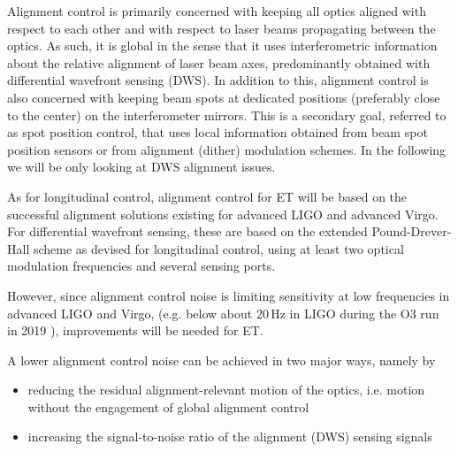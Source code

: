 Alignment control is primarily concerned with keeping all optics aligned with respect to each other
and with respect to laser beams propagating between the optics.
As such, it is global in the sense that it uses interferometric information about the relative alignment
of laser beam axes, predominantly obtained with differential wavefront sensing (DWS). 
In addition to this, alignment control is also concerned with keeping beam spots at dedicated positions (preferably close to the center) on the interferometer mirrors. This is a secondary goal, referred to as spot position control, that uses local information obtained from beam spot position sensors or from alignment (dither) modulation schemes. In the following we will be only looking at DWS alignment issues.

As for longitudinal control, alignment control for ET will be based on the successful alignment
solutions existing for advanced LIGO and advanced Virgo.
For differential wavefront sensing, these are based on the extended Pound-Drever-Hall scheme as devised for longitudinal control,
using at least two optical modulation frequencies and several sensing ports.

However, since alignment control noise is limiting sensitivity at low frequencies in advanced LIGO and Virgo, (e.g. below about 20\,Hz in LIGO during the O3 run in 2019 ), 
improvements will be needed for ET.

A lower alignment control noise can be achieved in two major ways, namely by 
\begin{itemize}
\item reducing the residual alignment-relevant motion of the optics, i.e. motion 
without the engagement of global alignment control
\item increasing the signal-to-noise ratio of the alignment (DWS) sensing signals
\end{itemize}

